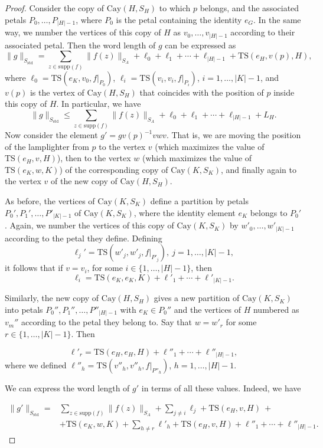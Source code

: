 \documentclass[reqno,oneside]{amsart}
\newcommand{\cay}[2]{\mathrm{Cay}(#1,#2)}
\newcommand{\supp}[1]{\mathrm{supp}(#1)}
\newcommand{\std}{S_{\mathrm{std}}}
\newcommand{\TS}[3]{\mathrm{TS}\left(#1,#2,#3\right)}
\theoremstyle{plain}
\theoremstyle{definition}
\begin{document}
\begin{proof}
	Consider the copy of $\cay{H}{S_H}$ to which $p$ belongs, and the associated petals $P_0,\ldots,P_{|H|-1}$, where $P_0$ is the petal containing the identity $e_G$. In the same way, we number the vertices of this copy of $H$ as $v_0,\ldots,v_{|H|-1}$ according to their associated petal. Then the word length of $g$ can be expressed as
	$$
	\|g\|_{\std}=\sum_{z\in \supp{f}}\|f(z)\|_{S_A}+\ell_0+\ell_1+\cdots+\ell_{|H|-1}+\TS{e_H}{v(p)}{H},
	$$
	where $\ell_0=\TS{e_K}{v_0}{f|_{P_0}}$, $\ell_i=\TS{v_i}{v_i}{f|_{P_i}}$, $i=1,\ldots,|K|-1$, and $v(p)$ is the vertex of $\cay{H}{S_H}$ that coincides with the position of $p$ inside this copy of $H$. In particular, we have
	$$
	\|g\|_{\std}\le\sum_{z\in \supp{f}}\|f(z)\|_{S_A}+\ell_0+\ell_1+\cdots+\ell_{|H|-1}+ L_H.
	$$
	Now consider the element $g'=gv(p)^{-1}vwv$. That is, we are moving the position of the lamplighter from $p$ to the vertex $v$ (which maximizes the value of $\TS{e_H}{v}{H}$), then to the vertex $w$ (which maximizes the value of $\TS{e_K}{w}{K}$) of the corresponding copy of $\cay{K}{S_K}$, and finally again to the vertex $v$ of the new copy of $\cay{H}{S_H}$. 
	
	As before, the vertices of $\cay{K}{S_K}$ define a partition by petals $P_0',P_1',\ldots,P'_{|K|-1}$ of $\cay{K}{S_K}$, where the identity element $e_K$ belongs to $P_0'$. Again, we number the vertices of this copy of $\cay{K}{S_K}$ by $w'_0,\ldots,w'_{|K|-1}$ according to the petal they define. Defining $$\ell_j'=\TS{w'_j}{w'_j}{f|_{P'_j}}, \ j=1,\ldots,|K|-1,$$
	it follows that if $v=v_i$, for some $i\in \{1,\ldots,|H|-1\}$, then
	$$
	\ell_i=\TS{e_K}{e_K}{K}+\ell'_1+\cdots+\ell'_{|K|-1}.
	$$
	
	Similarly, the new copy of $\cay{H}{S_H}$ gives a new partition of $\cay{K}{S_K}$ into petals $P_0'',P_1'',\ldots,P''_{|H|-1}$ with $e_K\in P_0''$ and the vertices of $H$ numbered as $v_m''$ according to the petal they belong to. Say that $w=w'_r$ for some $r\in \{1,\ldots,|K|-1\}$. Then
	
	$$
	\ell'_r= \TS{e_H}{e_H}{H}+ \ell''_1+\cdots+\ell''_{|H|-1},
	$$
	where we defined $\ell''_h=\TS{v''_h}{v''_h}{f|_{P''_h}}$, $h=1,\ldots, |H|-1$.
	
	
	We can express the word length of $g'$ in terms of all these values. Indeed, we have
	
	\begin{align*}
	\|g'\|_{\std}=&\sum_{z\in \supp{f}}\|f(z)\|_{S_A}+ \sum_{j\neq i}\ell_j +\TS{e_H}{v}{H}\ + \\ &+\TS{e_K}{w}{K}+\sum_{h\neq r}\ell'_h+\TS{e_H}{v}{H}+\ell''_1+\cdots+\ell''_{|H|-1}.
	\end{align*}
	

\end{proof}
\end{document}
